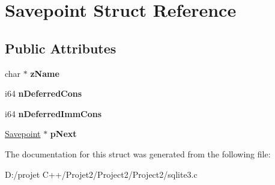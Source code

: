 \hypertarget{struct_savepoint}{}\section{Savepoint Struct Reference}
\label{struct_savepoint}
\subsection*{Public Attributes}
\begin{DoxyCompactItemize}
\item 
\mbox{\label{struct_savepoint_a0ba08ea77fcfd93099288375e2e9b1ec}} 
char $\ast$ {\bfseries z\+Name}
\item 
\mbox{\label{struct_savepoint_ae00dd8f725701d9e31da2edbb0b27435}} 
i64 {\bfseries n\+Deferred\+Cons}
\item 
\mbox{\label{struct_savepoint_a91b8cb5fac1bdf7d8f76ec30c82b862d}} 
i64 {\bfseries n\+Deferred\+Imm\+Cons}
\item 
\mbox{\label{struct_savepoint_a8d785c3c0eeb6f0c62ea5391892c78cb}} 
\mbox{\hyperlink{struct_savepoint}{Savepoint}} $\ast$ {\bfseries p\+Next}
\end{DoxyCompactItemize}


The documentation for this struct was generated from the following file\+:\begin{DoxyCompactItemize}
\item 
D\+:/projet C++/\+Projet2/\+Project2/\+Project2/sqlite3.\+c\end{DoxyCompactItemize}
